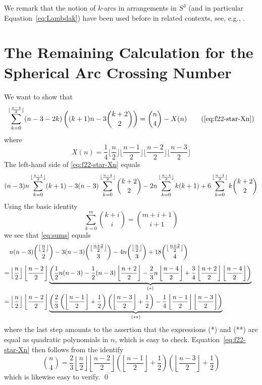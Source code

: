 \documentclass[a4paper,USenglish,cleveref, autoref, thm-restate,nolineno]{socg-lipics-v2021}
\DeclarePairedDelimiter\floor{\lfloor}{\rfloor}
\begin{document}
We remark that the notion of $k$-arcs in arrangements in $S^3$ (and in particular Equation~\eqref{eq:Lambdak}) have been used before in related contexts, see, e.g., \cite{Edelsbrunner:1989aa,Ramos:2009aa}. 



\appendix
\section{The Remaining Calculation for the Spherical Arc Crossing Number}
\label{sec:appendix-calculation}
We want to show that 
\begin{equation}
\sum_{k=0}^{\floor{\frac{n-4}{2}}} (n-3-2k)\left((k+1)n-3\binom{k+2}{2}\right)
=\binom{n}{4}-X(n)
\tag{\ref{eq:f22-star-Xn}}
\end{equation}
where 
\[
X(n)=\frac{1}{4}\Big\lfloor \frac{n}{2}\Big\rfloor \Big\lfloor \frac{n-1}{2} \Big\rfloor \Big\lfloor \frac{n-2}{2} \Big\rfloor \Big\lfloor \frac{n-3}{2}\Big\rfloor
\]
The left-hand side of \eqref{eq:f22-star-Xn} equals
\begin{equation}
\label{eq:sums}
(n-3)n\sum_{k=0}^{\floor{\frac{n-4}{2}}} (k+1) 
- 3(n-3)\sum_{k=0}^{\floor{\frac{n-4}{2}}} \binom{k+2}{2}
- 2n\sum_{k=0}^{\floor{\frac{n-4}{2}}} k(k+1) 
+ 6 \sum_{k=0}^{\floor{\frac{n-4}{2}}} k\binom{k+2}{2}
\end{equation}
Using the basic identity
\[ 
\sum_{k = 0}^m \binom{k+i}{i} = \binom{m+i+1}{i+1} 
\]
we see that \eqref{eq:sums} equals
\begin{eqnarray*}
& \displaystyle n(n-3) \binom{\floor{\frac{n}{2}}}{2} - 3 (n-3) \binom{\floor{\frac{n+2}{2}}}{3} - 4n \binom{\floor{\frac{n}{2}}}{3} + 18 \binom{\floor{\frac{n+2}{2}}}{4} & \\[1ex]
=& \displaystyle \left\lfloor \frac{n}{2} \right\rfloor \left\lfloor \frac{n-2}{2}\right\rfloor \underbrace{\left( \frac{1}{2} n(n-3) - \frac{1}{2} (n-3) \left\lfloor \frac{n+2}{2} \right\rfloor -\frac{2}{3}n \left\lfloor \frac{n-4}{2} \right \rfloor + \frac{3}{4} \left\lfloor \frac{n+2}{2} \right\rfloor \left\lfloor \frac{n-4}{2} \right\rfloor \right)}_{(*)}\\
= &  \displaystyle \left\lfloor \frac{n}{2} \right\rfloor \left\lfloor \frac{n-2}{2}\right\rfloor \underbrace{\left( \frac{2}{3} \left( \left\lfloor \frac{n-1}{2} \right\rfloor+ \frac{1}{2} \right) \left( \left\lfloor \frac{n-3}{2} \right\rfloor+ \frac{1}{2} \right) - \frac{1}{4} \left\lfloor \frac{n-1}{2} \right\rfloor \left\lfloor \frac{n-3}{2} \right\rfloor \right)}_{(**)}
\end{eqnarray*}
where the last step amounts to the assertion that the expressions (*) and (**) are equal as quadratic polynomials in $n$, which is easy to check. Equation~\eqref{eq:f22-star-Xn} then follows from the identify 
\[ 
\binom{n}{4} = \frac{2}{3}\left\lfloor \frac{n}{2} \right\rfloor \left\lfloor \frac{n-2}{2}\right\rfloor \left( \left\lfloor \frac{n-1}{2}\right\rfloor + \frac{1}{2} \right)  \left( \left\lfloor \frac{n-3}{2}\right\rfloor + \frac{1}{2} \right) 
\]
which is likewise easy to verify. \hfill \qed
\end{document}
